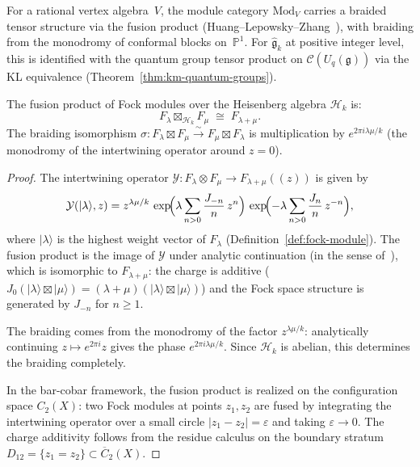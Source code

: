 \begin{remark}
\label{rem:tensor-structure-modules}
For a rational vertex algebra~$V$, the module category $\mathrm{Mod}_V$ carries a braided tensor structure via the fusion product (Huang--Lepowsky--Zhang~\cite{HLZ}), with braiding from the monodromy of conformal blocks on~$\mathbb{P}^1$. For $\widehat{\mathfrak{g}}_k$ at positive integer level, this is identified with the quantum group tensor product on $\mathcal{C}(U_q(\mathfrak{g}))$ via the KL equivalence (Theorem~\ref{thm:km-quantum-groups}).
\end{remark}

\begin{proposition}
\label{prop:fock-fusion-product}
The fusion product of Fock modules over the Heisenberg algebra
$\mathcal{H}_k$ is:
\[
F_\lambda \boxtimes_{\mathcal{H}_k} F_\mu
\;\cong\; F_{\lambda + \mu}.
\]
The braiding isomorphism
$\sigma: F_\lambda \boxtimes F_\mu \xrightarrow{\sim}
F_\mu \boxtimes F_\lambda$
is multiplication by $e^{2\pi i \lambda\mu/k}$
\textup{(}the monodromy of the intertwining operator around
$z = 0$\textup{)}.
\end{proposition}

\begin{proof}
The intertwining operator $\mathcal{Y}\colon F_\lambda \otimes
F_\mu \to F_{\lambda+\mu}((z))$ is given by
\[
\mathcal{Y}(|\lambda\rangle, z)
= z^{\lambda\mu/k}\,
\exp\!\Bigl(\lambda \sum_{n > 0} \frac{J_{-n}}{n}\, z^n\Bigr)\,
\exp\!\Bigl(-\lambda \sum_{n > 0} \frac{J_n}{n}\, z^{-n}\Bigr),
\]
where $|\lambda\rangle$ is the highest weight vector of $F_\lambda$
(Definition~\ref{def:fock-module}). The fusion product is the image of
$\mathcal{Y}$ under analytic continuation (in the sense
of~\cite{HLZ}), which is isomorphic to $F_{\lambda+\mu}$: the
charge is additive ($J_0(|\lambda\rangle \boxtimes |\mu\rangle)
= (\lambda + \mu)(|\lambda\rangle \boxtimes |\mu\rangle)$) and
the Fock space structure is generated by $J_{-n}$ for $n \geq 1$.

The braiding comes from the monodromy of the factor
$z^{\lambda\mu/k}$: analytically continuing $z \mapsto
e^{2\pi i} z$ gives the phase $e^{2\pi i \lambda\mu/k}$.
Since $\mathcal{H}_k$ is abelian, this determines the braiding
completely.

In the bar-cobar framework, the fusion product is realized on the
configuration space $C_2(X)$: two Fock modules at points $z_1, z_2$
are fused by integrating the intertwining operator over a small circle
$|z_1 - z_2| = \varepsilon$ and taking $\varepsilon \to 0$. The
charge additivity follows from the residue calculus on the boundary
stratum $D_{12} = \{z_1 = z_2\} \subset \overline{C}_2(X)$.
\end{proof}

